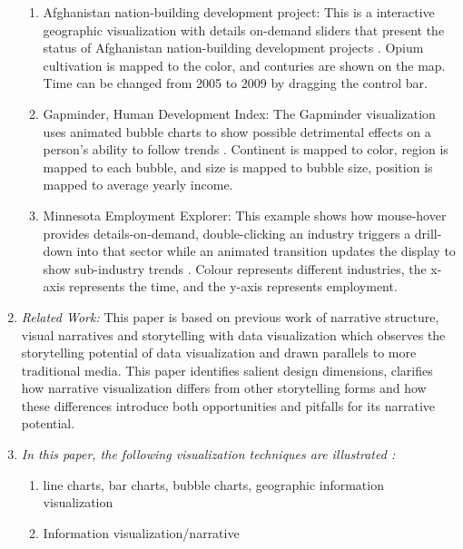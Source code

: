 \documentclass{egpubl}
\begin{document}
\begin{enumerate}
\begin{enumerate}
\item Afghanistan nation-building development project: This is a interactive geographic visualization with details on-demand sliders that present the status of Afghanistan nation-building development projects \cite{afghanistan}. Opium cultivation is mapped to the color, and conturies are shown on the map. Time can be changed from 2005 to 2009 by dragging the control bar.
\item Gapminder, Human Development Index: The Gapminder visualization uses animated bubble charts to show possible detrimental effects on a person's ability to follow trends \cite{gapminder2}. Continent is mapped to color, region is mapped to each bubble, and size is mapped to bubble size, position is mapped to average yearly income.
\item Minnesota Employment Explorer: This example shows how mouse-hover provides details-on-demand, double-clicking an industry triggers a drill-down into that sector while an animated transition updates the display to show sub-industry trends \cite{heer2}. Colour represents different industries, the x-axis represents the time, and the y-axis represents employment.
\end{enumerate}
\item \textit{Related Work:} This paper is based on previous work of narrative structure, visual narratives and storytelling with data visualization \cite{Heer1} which observes the storytelling potential of data visualization and drawn parallels to more traditional media. This paper identifies salient design dimensions, clarifies how narrative visualization differs from other storytelling forms and how these differences introduce both opportunities and pitfalls for its narrative potential.
\item \textit{In this paper, the following visualization techniques are illustrated :} 
\begin{enumerate}
\item line charts, bar charts, bubble charts, geographic information visualization 
\item Information visualization/narrative
\end{enumerate}
\end{enumerate}
\end{document}
